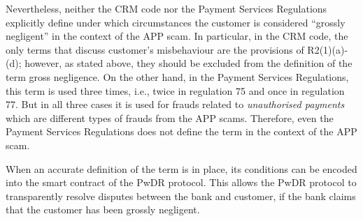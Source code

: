  Nevertheless, neither the CRM code  nor the Payment Services Regulations   explicitly define under which circumstances the customer is considered ``grossly negligent'' in the context of the APP scam. In particular, in the CRM code, the only terms that discuss customer's misbehaviour are  the provisions of R2(1)(a)-(d); however, as stated above, they should be excluded from the definition of the term gross negligence. On the  other hand,  in the Payment Services Regulations, this term is used three times, i.e.,  twice in regulation 75 and once in regulation 77. But in all  three cases it is used for frauds related to \emph{unauthorised payments} which are  different types of frauds from the APP scams. Therefore, even the Payment Services Regulations does not define the term in the context of the APP scam. 
 
 When an  accurate definition of the term is in place,  its conditions can be encoded into the smart contract of the PwDR protocol. This allows the PwDR protocol to transparently resolve  disputes  between the bank and customer, if the bank claims that the customer has been  grossly negligent. 




